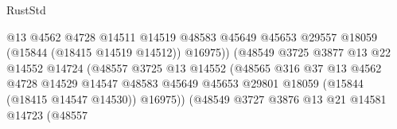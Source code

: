 \begin{lexlean}{RustStd}
\begin{coremodule}
                                                  @13
                                                  @4562
                                                  @4728
                                                  @14511
                                                  @14519
                                                  @48583
                                                  @45649
                                                  @45653
                                                  @29557
                                                  @18059
                                                  (@15844 (@18415 @14519 @14512))
                                                  @16975))
                                              (@48549
                                                @3725
                                                @3877
                                                @13
                                                @22
                                                @14552
                                                @14724
                                                (@48557
                                                  @3725
                                                  @13
                                                  @14552
                                                  (@48565
                                                    @316
                                                    @37
                                                    @13
                                                    @4562
                                                    @4728
                                                    @14529
                                                    @14547
                                                    @48583
                                                    @45649
                                                    @45653
                                                    @29801
                                                    @18059
                                                    (@15844 (@18415 @14547 @14530))
                                                    @16975))
                                                (@48549
                                                  @3727
                                                  @3876
                                                  @13
                                                  @21
                                                  @14581
                                                  @14723
                                                  (@48557

\end{coremodule}
\end{lexlean}
